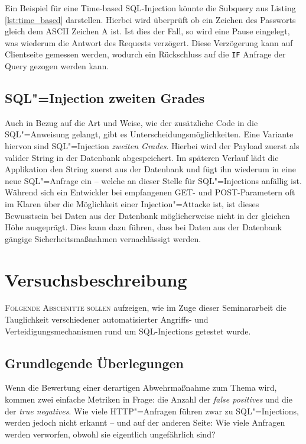 Ein Beispiel für eine Time-based SQL-Injection könnte die Subquery aus Listing \ref{lst:time_based} darstellen. Hierbei wird überprüft ob ein Zeichen des Passworts gleich dem ASCII Zeichen A ist. Ist dies der Fall, so wird eine Pause eingelegt, was wiederum die Antwort des Requests verzögert. Diese Verzögerung kann auf Clientseite gemessen werden, wodurch ein Rückschluss auf die \texttt{IF} Anfrage der Query gezogen werden kann.



\section{SQL"=Injection zweiten Grades}

Auch in Bezug auf die Art und Weise, wie der zusätzliche Code in die SQL"=Anweisung gelangt, gibt es Unterscheidungsmöglichkeiten. Eine Variante hiervon sind SQL"=Injection \emph{zweiten Grades}. Hierbei wird der Payload zuerst als valider String in der Datenbank abgespeichert. Im späteren Verlauf lädt die Applikation den String zuerst aus der Datenbank und fügt ihn wiederum in eine neue SQL"=Anfrage ein -- welche an dieser Stelle für SQL"=Injections anfällig ist. Während sich ein Entwickler bei empfangenen GET- und POST-Parametern oft im Klaren über die Möglichkeit einer Injection"=Attacke ist, ist dieses Bewusstsein bei Daten aus der Datenbank möglicherweise nicht in der gleichen Höhe ausgeprägt. Dies kann dazu führen, dass bei Daten aus der Datenbank gängige Sicherheitsmaßnahmen vernachlässigt werden.














\chapter{Versuchsbeschreibung}

\lettrine{F}{olgende Abschnitte sollen} aufzeigen, wie im Zuge dieser Seminararbeit die Tauglichkeit verschiedener automatisierter Angriffs- und Verteidigungsmechanismen rund um SQL-Injections getestet wurde.

\section{Grundlegende Überlegungen}

Wenn die Bewertung einer derartigen Abwehrmaßnahme zum Thema wird, kommen zwei einfache Metriken in Frage: die Anzahl der \emph{false positives} und die der \emph{true negatives}. Wie viele HTTP"=Anfragen führen zwar zu SQL"=Injections, werden jedoch nicht erkannt -- und auf der anderen Seite: Wie viele Anfragen werden verworfen, obwohl sie eigentlich ungefährlich sind?

